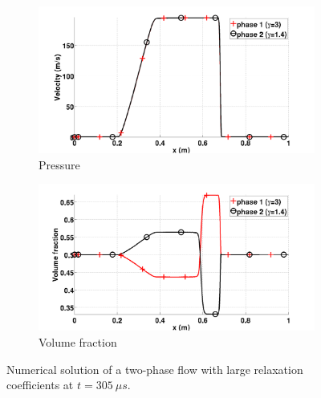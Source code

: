 \documentclass[preprint,10pt]{elsarticle}
\begin{document}
\begin{figure}[H]
        \begin{subfigure}[b]{0.495\textwidth}
                \centering
                \includegraphics[width=\textwidth]{figures/relaxation_two_phases_velocity.png}
                \caption{Pressure}
                \label{fig:inf-rel-press}
        \end{subfigure}        
        \begin{subfigure}[b]{0.495\textwidth}
                \centering
                \includegraphics[width=\textwidth]{figures/relaxation_two_phases_volume_fraction.png}
                \caption{Volume fraction}
                \label{fig:inf-rel-vf}
        \end{subfigure}
        \caption{Numerical solution of a two-phase flow with large relaxation coefficients at $t=305 \ \mu s$.}\label{fig:inf-rel-variables}
\end{figure}
%
\end{document}
